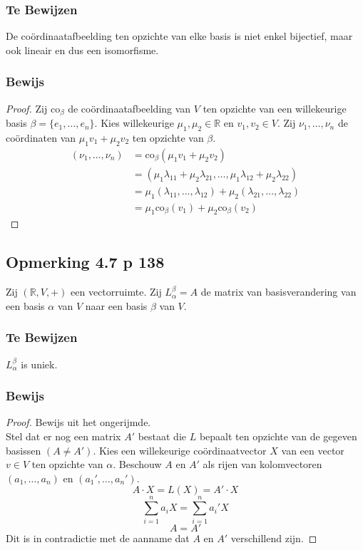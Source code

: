 \documentclass[lineaire_algebra_oplossingen.tex]{subfiles}
\begin{document}
\subsubsection*{Te Bewijzen}
De co\"ordinaatafbeelding ten opzichte van elke basis is niet enkel bijectief, maar ook lineair en dus een isomorfisme.
\subsubsection*{Bewijs}
\begin{proof}
Zij $\text{co}_{\beta}$ de co\"ordinaatafbeelding van $V$ ten opzichte van een willekeurige basis $\beta = \{e_1,\ldots,e_n\}$.
Kies willekeurige $\mu_1,\mu_2 \in \mathbb{R}$ en $v_1,v_2 \in V$. Zij $\nu_1,\ldots,\nu_n$ de co\"ordinaten van $\mu_1v_1+\mu_2v_2$ ten opzichte van $\beta$.
\begin{align*}
(\nu_1,\ldots,\nu_n)
&= \text{co}_{\beta}(\mu_1v_1+\mu_2v_2) \\
&= (\mu_1\lambda_{11}+ \mu_2\lambda_{21},\ldots,\mu_1\lambda_{12}+ \mu_2\lambda_{22}) \\
&= \mu_1(\lambda_{11},\ldots,\lambda_{12})
+ \mu_2(\lambda_{21},\ldots,\lambda_{22}) \\
&= \mu_1\text{co}_{\beta}(v_1)+\mu_2\text{co}_{\beta}(v_2)
\end{align*}
\end{proof}


\subsection{Opmerking 4.7 p 138}
\label{4.7}
Zij $(\mathbb{R},V,+)$ een vectorruimte.
Zij $L_{\alpha}^{\beta} = A$ de matrix van basisverandering van een basis $\alpha$ van $V$ naar een basis $\beta$ van $V$.

\subsubsection*{Te Bewijzen}
$L_{\alpha}^{\beta}$ is uniek.

\subsubsection*{Bewijs}
\begin{proof}
Bewijs uit het ongerijmde.\\
Stel dat er nog een matrix $A'$ bestaat die $L$ bepaalt ten opzichte van de gegeven basissen $(A\neq A')$.
Kies een willekeurige co\"ordinaatvector $X$ van een vector $v\in V$ ten opzichte van $\alpha$. Beschouw $A$ en $A'$ als rijen van kolomvectoren $(a_1,\ldots,a_n)$ en $(a_1',\ldots,a_n')$.
\[
A \cdot X = L(X) = A'\cdot X
\]
\[
\sum_{i=1}^na_iX = \sum_{i=1}^na_i'X
\]
\[
A=A'
\]
Dit is in contradictie met de aanname dat $A$ en $A'$ verschillend zijn.
\end{proof}
\end{document}

